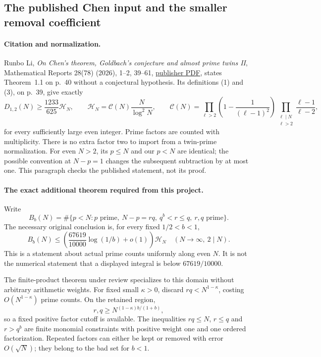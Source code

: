 \subsection{The published Chen input and the smaller removal coefficient}
\label{sec:external-published-chen-lower-k-independent-transfer}

\paragraph{Citation and normalization.}
Runbo Li, \emph{On Chen's theorem, Goldbach's conjecture and almost prime
twins II}, Mathematical Reports 28(78) (2026), 1--2, 39--61,
\href{https://imar.ro/journals/Mathematical_Reports/Pdfs/2026/1_2/3.pdf}
{publisher PDF}, states Theorem~1.1 on p.~40 without a conjectural
hypothesis. Its definitions (1) and (3), on p.~39, give exactly
\[
 D_{1,2}(N)\ge\frac{1233}{625}\mathcal H_N,\qquad
 \mathcal H_N=\mathcal C(N)\frac{N}{\log^2N},\qquad
 \mathcal C(N)=\prod_{\ell>2}\left(1-\frac1{(\ell-1)^2}\right)
 \prod_{\substack{\ell\mid N\\\ell>2}}\frac{\ell-1}{\ell-2},
\]
for every sufficiently large even integer. Prime factors are counted
with multiplicity. There is no extra factor two to import from a twin-prime
normalization. For even $N>2$, its $p\le N$ and our $p<N$ are identical;
the possible convention at $N-p=1$ changes the subsequent subtraction
by at most one. This paragraph checks the published statement, not its proof.

\paragraph{The exact additional theorem required from this project.}
Write
\[
 B_b(N)=\#\{p<N:p\text{ prime},\ N-p=rq,\ q^b<r\le q,
                 \ r,q\text{ prime}\}.
\]
The necessary original conclusion is, for every fixed $1/2<b<1$,
\begin{equation}\label{eq:external-lower-k-required-upper}
 B_b(N)\le\left(\frac{67619}{10000}\log(1/b)+o(1)\right)
               \mathcal H_N
 \quad(N\longrightarrow\infty,\ 2\mid N).
\end{equation}
This is a statement about actual prime counts uniformly along even $N$.
It is not the numerical statement that a displayed integral is below
$67619/10000$.

The finite-product theorem under review specializes to this domain
without arbitrary arithmetic weights. For fixed small $\kappa>0$,
discard $rq<N^{1-\kappa}$, costing $O(N^{1-\kappa})$ prime counts.
On the retained region,
\[
 r,q\ge N^{(1-\kappa)b/(1+b)},
\]
so a fixed positive factor cutoff is available. The inequalities
$rq\le N$, $r\le q$ and $r>q^b$ are finite monomial constraints with
positive weight one and one ordered factorization. Repeated factors
can either be kept or removed with error $O(\sqrt N)$; they belong to
the bad set for $b<1$.

